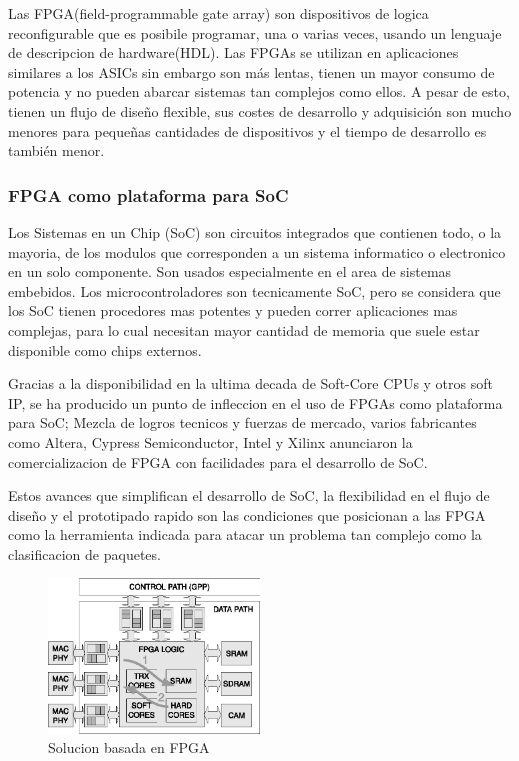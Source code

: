 Las FPGA(field-programmable gate array) son dispositivos de logica reconfigurable que es posibile programar, una o varias veces, usando un lenguaje de descripcion de hardware(HDL). Las FPGAs se utilizan en aplicaciones similares a los ASICs sin embargo son más lentas, tienen un mayor consumo de potencia y no pueden abarcar sistemas tan complejos como ellos. A pesar de esto, tienen un flujo de diseño flexible, sus costes de desarrollo y adquisición son mucho menores para pequeñas cantidades de dispositivos y el tiempo de desarrollo es también menor.

\subsubsection{FPGA como plataforma para SoC}

Los Sistemas en un Chip (SoC) son circuitos integrados que contienen todo, o la mayoria, de los modulos que corresponden a un sistema informatico o electronico en un solo componente. Son usados especialmente en el area de sistemas embebidos. Los microcontroladores son tecnicamente SoC, pero se considera que los SoC tienen procedores mas potentes y pueden correr aplicaciones mas complejas, para lo cual necesitan mayor cantidad de memoria que suele estar disponible como chips externos. 

Gracias a la disponibilidad en la ultima decada de Soft-Core CPUs y otros soft IP, se ha producido un punto de infleccion en el uso de FPGAs como plataforma para SoC; Mezcla de logros tecnicos y fuerzas de mercado, varios fabricantes como Altera, Cypress Semiconductor, Intel y Xilinx anunciaron la comercializacion de FPGA con facilidades para el desarrollo de SoC.

Estos avances que simplifican el desarrollo de SoC, la flexibilidad en el flujo de diseño y el prototipado rapido son las condiciones que posicionan a las FPGA como la herramienta indicada para atacar un problema tan complejo como la clasificacion de paquetes. 

 \begin{figure}[h]
  \centering
	 \includegraphics[width=0.5\textwidth]{1-introduccion/graf/FPGA_based.eps}
  \caption{Solucion basada en FPGA}
  \label{fig:diseno}
\end{figure}

